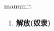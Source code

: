 
\begin{frame}
{\huge manumit}
\begin{center}
\begin{enumerate}\Large
  \item \textbf{解放(奴隶)}
\end{enumerate}
\end{center}
\end{frame}
